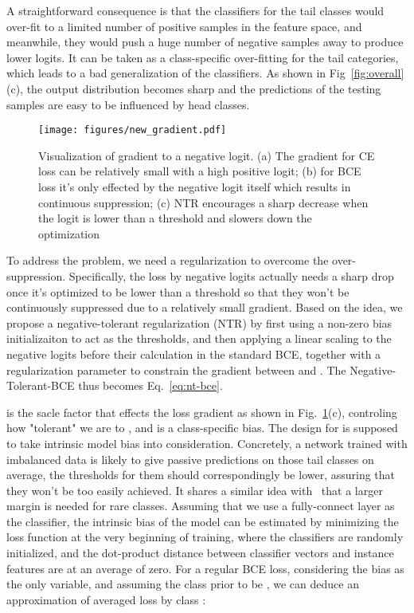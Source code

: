 \documentclass[runningheads]{llncs}
\begin{document}
A straightforward consequence is that the classifiers for the tail classes would over-fit to a limited number of positive samples in the feature space, and meanwhile, they would push a huge number of negative samples away to produce lower logits.
It can be taken as a class-specific over-fitting for the tail categories, which leads to a bad generalization of the classifiers.
As shown in Fig~\ref{fig:overall}(c),
the output distribution becomes sharp and the predictions of the testing samples are easy to be influenced by head classes.


\begin{figure}[t]
    \centering
    \texttt{[image: figures/new\_gradient.pdf]}\caption{
        Visualization of gradient to a negative logit. (a) The gradient for CE loss can be relatively small with a high positive logit; (b) for BCE loss it's only effected by the negative logit itself which results in continuous suppression; (c) NTR encourages a sharp decrease when the logit is lower than a threshold and slowers down the optimization
    }
    \label{fig:gradient} 
\end{figure}

To address the problem, we need a regularization to overcome the over-suppression.
Specifically, the loss by negative logits actually needs a sharp drop once it's optimized to be lower than a threshold so that they won't be continuously suppressed due to a relatively small gradient.
Based on the idea, we propose a negative-tolerant regularization (NTR) by first using a non-zero bias initializaiton to act as the thresholds, and then applying a linear scaling to the negative logits before their calculation in the standard BCE, together with a regularization parameter to constrain the gradient between  and .
The Negative-Tolerant-BCE thus becomes Eq.~\ref{eq:nt-bce}.


 is the sacle factor that effects the loss gradient as shown in Fig.~\ref{fig:gradient}(c), controling how "tolerant" we are to , and  is a class-specific bias.
The design for  is supposed to take intrinsic model bias into consideration.
Concretely, a network trained with imbalanced data is likely to give passive predictions on those tail classes on average, the thresholds for them should correspondingly be lower, assuring that they won't be too easily achieved. 
It shares a similar idea with~\cite{cao2019ldam} that a larger margin is needed for rare classes.
Assuming that we use a fully-connect layer as the classifier, the intrinsic bias of the model can be estimated by minimizing the loss function at the very beginning of training, where the classifiers are randomly initialized, and the dot-product distance between classifier vectors and instance features are at an average of zero.
For a regular BCE loss, considering the bias  as the only variable, and assuming the class prior to be , we can deduce an approximation of averaged loss by class : 
\end{document}
